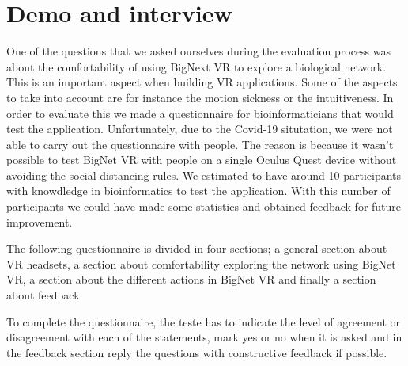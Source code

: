 \section{Demo and interview}
One of the questions that we asked ourselves during the evaluation process was about the comfortability of using BigNext VR to explore a biological network. This is an important aspect when building VR applications. Some of the aspects to take into account are for instance the motion sickness or the intuitiveness. In order to evaluate this we made a questionnaire for bioinformaticians that would test the application. Unfortunately, due to the Covid-19 situtation\cite{covid_19}, we were not able to carry out the questionnaire with people. The reason is because it wasn't possible to test BigNet VR with people on a single Oculus Quest device without avoiding the social distancing rules.
We estimated to have around 10 participants with knowdledge in bioinformatics to test the application. With this number of participants we could have made some statistics and obtained feedback for future improvement.

The following questionnaire is divided in four sections; a general section about VR headsets, a section about comfortability exploring the network using BigNet VR, a section about the different actions in BigNet VR and finally a section about feedback.

To complete the questionnaire, the teste has to indicate the level of agreement or disagreement with each of the  statements, mark yes or no when it is asked and in the feedback section reply the questions with constructive feedback if possible.\\


